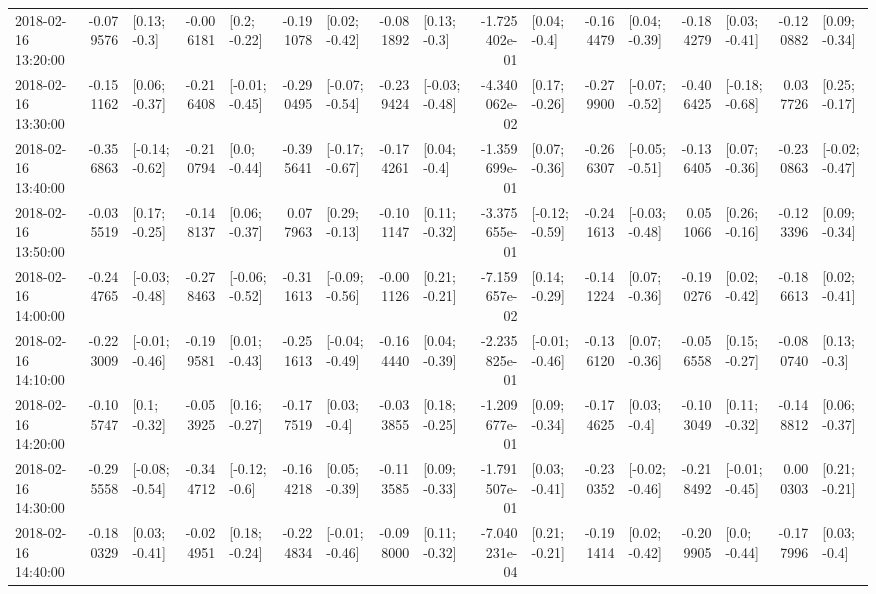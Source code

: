 \begin{tabular}{lrlrlrlrlrlrlrlrl}
2018-02-16 13:20:00 & -0.079576 &    [0.13; -0.3] & -0.006181 &    [0.2; -0.22] & -0.191078 &   [0.02; -0.42] & -0.081892 &    [0.13; -0.3] & -1.725402e-01 &    [0.04; -0.4] & -0.164479 &   [0.04; -0.39] & -0.184279 &   [0.03; -0.41] & -0.120882 &   [0.09; -0.34] \\
2018-02-16 13:30:00 & -0.151162 &   [0.06; -0.37] & -0.216408 &  [-0.01; -0.45] & -0.290495 &  [-0.07; -0.54] & -0.239424 &  [-0.03; -0.48] & -4.340062e-02 &   [0.17; -0.26] & -0.279900 &  [-0.07; -0.52] & -0.406425 &  [-0.18; -0.68] &  0.037726 &   [0.25; -0.17] \\
2018-02-16 13:40:00 & -0.356863 &  [-0.14; -0.62] & -0.210794 &    [0.0; -0.44] & -0.395641 &  [-0.17; -0.67] & -0.174261 &    [0.04; -0.4] & -1.359699e-01 &   [0.07; -0.36] & -0.266307 &  [-0.05; -0.51] & -0.136405 &   [0.07; -0.36] & -0.230863 &  [-0.02; -0.47] \\
2018-02-16 13:50:00 & -0.035519 &   [0.17; -0.25] & -0.148137 &   [0.06; -0.37] &  0.077963 &   [0.29; -0.13] & -0.101147 &   [0.11; -0.32] & -3.375655e-01 &  [-0.12; -0.59] & -0.241613 &  [-0.03; -0.48] &  0.051066 &   [0.26; -0.16] & -0.123396 &   [0.09; -0.34] \\
2018-02-16 14:00:00 & -0.244765 &  [-0.03; -0.48] & -0.278463 &  [-0.06; -0.52] & -0.311613 &  [-0.09; -0.56] & -0.001126 &   [0.21; -0.21] & -7.159657e-02 &   [0.14; -0.29] & -0.141224 &   [0.07; -0.36] & -0.190276 &   [0.02; -0.42] & -0.186613 &   [0.02; -0.41] \\
2018-02-16 14:10:00 & -0.223009 &  [-0.01; -0.46] & -0.199581 &   [0.01; -0.43] & -0.251613 &  [-0.04; -0.49] & -0.164440 &   [0.04; -0.39] & -2.235825e-01 &  [-0.01; -0.46] & -0.136120 &   [0.07; -0.36] & -0.056558 &   [0.15; -0.27] & -0.080740 &    [0.13; -0.3] \\
2018-02-16 14:20:00 & -0.105747 &    [0.1; -0.32] & -0.053925 &   [0.16; -0.27] & -0.177519 &    [0.03; -0.4] & -0.033855 &   [0.18; -0.25] & -1.209677e-01 &   [0.09; -0.34] & -0.174625 &    [0.03; -0.4] & -0.103049 &   [0.11; -0.32] & -0.148812 &   [0.06; -0.37] \\
2018-02-16 14:30:00 & -0.295558 &  [-0.08; -0.54] & -0.344712 &   [-0.12; -0.6] & -0.164218 &   [0.05; -0.39] & -0.113585 &   [0.09; -0.33] & -1.791507e-01 &   [0.03; -0.41] & -0.230352 &  [-0.02; -0.46] & -0.218492 &  [-0.01; -0.45] &  0.000303 &   [0.21; -0.21] \\
2018-02-16 14:40:00 & -0.180329 &   [0.03; -0.41] & -0.024951 &   [0.18; -0.24] & -0.224834 &  [-0.01; -0.46] & -0.098000 &   [0.11; -0.32] & -7.040231e-04 &   [0.21; -0.21] & -0.191414 &   [0.02; -0.42] & -0.209905 &    [0.0; -0.44] & -0.177996 &    [0.03; -0.4] \\

\end{tabular}
